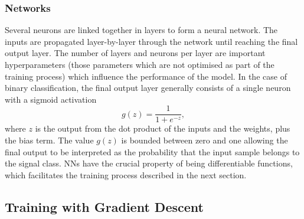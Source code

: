 \subsubsection{Networks}

Several neurons are linked together in layers to form a neural network.
The inputs are propagated layer-by-layer through the network until reaching the final output layer.
The number of layers and neurons per layer are important hyperparameters (those parameters which are not optimised as part of the training process) which influence the performance of the model.
In the case of binary classification, the final output layer generally consists of a single neuron with a sigmoid activation 
%
\begin{equation}\label{eq:sigmoid}
  g(z) = \frac{1}{1 + e^{-z}} ,
\end{equation}
%
where $z$ is the output from the dot product of the inputs and the weights, plus the bias term.
The value $g(z)$ is bounded between zero and one allowing the final output to be interpreted as the probability that the input sample belongs to the signal class.
NNs have the crucial property of being differentiable functions, which facilitates the training process described in the next section.





\subsection{Training with Gradient Descent}\label{sec:training_sgd}

